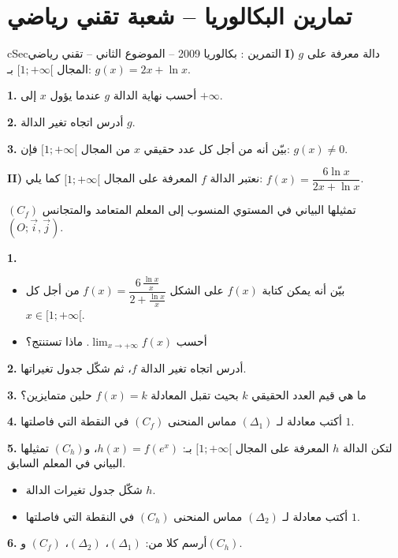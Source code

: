 \documentclass[12pt,a4paper]{article}
\newenvironment{BOX}[2]{\begin{otherlanguage}{english}\begin{arbox}{#1}{#2}}{\end{arbox}\end{otherlanguage}}
\newcounter{exo}
\newenvironment{tamrin}[1]{\stepcounter{exo}\begin{BOX}{cSec}{التمرين \theexo: #1}}{\end{BOX}}
\newenvironment{LTR}{\begin{otherlanguage}{english}}{\end{otherlanguage}}
\newenvironment{sq}{\begin{itemize}[leftmargin=2.4em,itemsep=3pt]}{\end{itemize}}
\newcommand{\qa}{\item[(أ)]}\newcommand{\qb}{\item[(ب)]}\newcommand{\qc}{\item[(جـ)]}\newcommand{\qd}{\item[(د)]}\newcommand{\qe}{\item[(هـ)]}
\newcommand{\QQ}[1]{\par\smallskip\textbf{#1.} }
\begin{document}
\section{تمارين البكالوريا -- شعبة تقني رياضي}
\newenvironment{GRtm}[7]{\par\begin{center}\begin{LTR}\begin{tikzpicture}[x=#5cm,y=#6cm,font=\footnotesize]
 \draw[gray!25,very thin,xstep=1,ystep=#7] (#1,#3) grid (#2,#4);
 \draw[-{Stealth[length=2mm]}] (#1,0)--(#2+0.2,0) node[below left]{$x$};
 \draw[-{Stealth[length=2mm]}] (0,#3)--(0,#4+0.1) node[below left]{$y$};
 \node[below left] at (0,0){$O$};
 \begin{scope}\clip (#1,#3) rectangle (#2,#4);}
{\end{scope}\end{tikzpicture}\end{LTR}\end{center}}

\begin{tamrin}{بكالوريا 2009 -- الموضوع الثاني -- تقني رياضي}
\textbf{I)} $g$ دالة معرفة على المجال $[1;+\infty[$ بـ: $g(x)=2x+\ln x$.
\QQ{1} أحسب نهاية الدالة $g$ عندما يؤول $x$ إلى $+\infty$.
\QQ{2} أدرس اتجاه تغير الدالة $g$.
\QQ{3} بيّن أنه من أجل كل عدد حقيقي $x$ من المجال $[1;+\infty[$ فإن: $g(x)\neq 0$.

\textbf{II)} نعتبر الدالة $f$ المعرفة على المجال $[1;+\infty[$ كما يلي: $f(x)=\dfrac{6\ln x}{2x+\ln x}$.

$(C_f)$ تمثيلها البياني في المستوي المنسوب إلى المعلم المتعامد والمتجانس $(O;\vec{i},\vec{j})$.
\QQ{1}
\begin{sq}
\qa بيّن أنه يمكن كتابة $f(x)$ على الشكل $f(x)=\dfrac{6\,\frac{\ln x}{x}}{2+\frac{\ln x}{x}}$ من أجل كل $x\in[1;+\infty[$.
\qb أحسب $\displaystyle\lim_{x\to+\infty}f(x)$. ماذا تستنتج؟
\end{sq}
\QQ{2} أدرس اتجاه تغير الدالة $f$، ثم شكّل جدول تغيراتها.
\QQ{3} ما هي قيم العدد الحقيقي $k$ بحيث تقبل المعادلة $f(x)=k$ حلين متمايزين؟
\QQ{4} أكتب معادلة لـ $(\Delta_1)$ مماس المنحنى $(C_f)$ في النقطة التي فاصلتها $1$.
\QQ{5} لتكن الدالة $h$ المعرفة على المجال $[1;+\infty[$ بـ: $h(x)=f\left(e^x\right)$، و$(C_h)$ تمثيلها البياني في المعلم السابق.
\begin{sq}
\qa شكّل جدول تغيرات الدالة $h$.
\qb أكتب معادلة لـ $(\Delta_2)$ مماس المنحنى $(C_h)$ في النقطة التي فاصلتها $1$.
\end{sq}
\QQ{6} أرسم كلا من: $(\Delta_1)$، $(\Delta_2)$، $(C_f)$ و$(C_h)$.
\end{tamrin}
\end{document}
